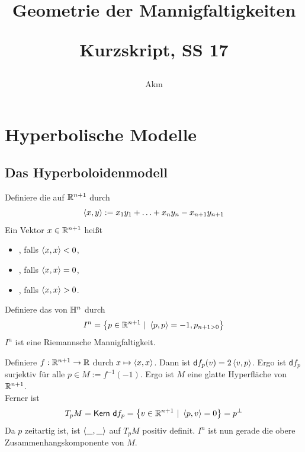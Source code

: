 \documentclass{book}
\renewcommand{\d}{\textsf{d}}
\begin{document}
\title{
\begin{huge}
Geometrie der Mannigfaltigkeiten\\
\end{huge}
\begin{large}
Kurzskript, SS 17
\end{large}}


\author{Ak\i n}
\maketitle
\renewcommand{\i}{^{-1}}


\setcounter{tocdepth}{1}
\tableofcontents

\newpage
\chapter{Hyperbolische Modelle}
\section{Das Hyperboloidenmodell}
\Def{}
Definiere die  auf $\mathbb{R}^{n+1}$ durch
\[ \left<x,y\right> := x_1y_1 + \ldots + x_{n}y_n - x_{n+1} y_{n+1} \]
Ein Vektor $x \in \mathbb{R}^{n+1}$ heißt
\begin{itemize}
	\item {}, falls $\left<x,x\right> < 0$,
	\item {}, falls $\left<x,x\right> = 0$,
	\item {}, falls $\left<x,x\right> > 0$.
\end{itemize}
Definiere das  von $\mathbb{H}^n$ durch
\[ I^n = \set{p \in \R^{n+1}}{\shrp{p,p} = -1, p_{n+1 > 0}} \]
\Prop{}
$I^n$ ist eine Riemannsche Mannigfaltigkeit.
\begin{Beweis}{}
Definiere $f : \mathbb{R}^{n+1} \overset{}{\rightarrow} \mathbb{R}$ durch $x \mapsto \left<x,x\right>$. Dann ist $\d f_p(v) = 2\shrp{v,p}$. Ergo ist $\d f_p$ surjektiv für alle $p \in M :=f\i(-1)$. Ergo ist $M$ eine glatte Hyperfläche von $\mathbb{R}^{n+1}$.\\
Ferner ist
\[ T_pM = \Ker ~\d f_p  = \set{v \in \R^{n+1}}{\shrp{p,v} = 0} = p^\bot \]
Da $p$ zeitartig ist, ist $\left<\_, \_\right>$ auf $T_pM$ positiv definit. $I^n$ ist nun gerade die obere Zusammenhangskomponente von $M$.
\end{Beweis}
\end{document}
